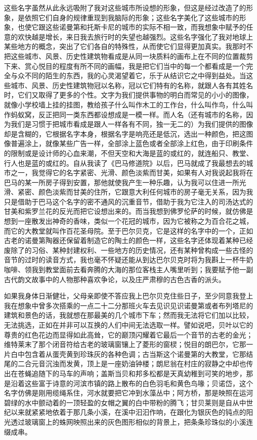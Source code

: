 \par 这些名字虽然从此永远吸附了我对这些城市所设想的形象，但这是经过改造了的形象，是依照它们自身的规律重现到我脑际的形象；这些名字美化了这些城市的形象，也使它跟这些诺曼第和托斯卡尼的城市的实际不相一致，而我想象中赋予的任意的欢快越是增长，来日我去旅行时的失望也越强烈。这些名字强化了我对地球上某些地方的概念，突出了它们各自的特殊性，从而使它们显得更加真实。我那时不把这些城市、风景、历史性建筑物看成是从同一块质料的画布上在不同的位置裁剪下来、赏心悦目的程度有所不同的画幅，我是把它们当中的每一个都看成是一个完全与众不同的陌生的东西，我的心灵渴望着它，乐于从结识它之中得到益处。当这些城市、风景、历史性建筑物冠以名称，冠以它们特有的名称，就跟人各有其姓名时，它们又取得了更多的个性。文字为我们提供事物的明白而常见的小小的图像，就像小学校墙上挂的挂图，教给孩子什么叫作木工的工作台，什么叫作鸟，什么叫作蚂蚁窝，反正把同一类东西都设想成是一模一样。而人名（还有城市的名称，因为我们是习惯于把城市看成是跟人一样各有不同，独一无二的）为我们提供的图像却是含糊的，它根据名字本身，根据名字是响亮还是低沉，选出一种颜色，把这图像普遍涂上，就像某些广告一样，全部涂上蓝色或者全部涂上红色，由于印刷条件的限制或是设计师的心血来潮，不但天空和大海是蓝的或红的，就连船只、教堂、行人也是蓝的或红的。自从我读了《巴马修道院》以后，巴马就成了我最想去的城市之一，我觉得它的名字紧密、光滑、颜色淡紫而甘美，如果有人对我说起我将在巴马的某一所房子得到安置，那他就使我产生一种乐趣，认为我可以住进一所光滑、紧密、颜色淡紫而甘美的住所，它跟意大利任何城市的房子毫无关系，因为我只是借助于巴马这个名字的密不通风的沉重音节，借助于我为它注入的司汤达式的甘美和紫罗兰花的反光而把它设想出来的。而当我想到佛罗伦萨的时候，就仿佛是想到一座散发出神奇的香味，类似一个花冠的城市，因为它被称之为百合花之城，而它的大教堂就叫作百花圣母院。至于巴尔贝克，它是这样的名字中的一个，正如古老的诺曼第陶器还保留着制造它的陶土的颜色一样，这些名字还体现着某种已经废除了的习俗、某种封建权利、一些地方的历史情况，还有某种曾构成一些古怪的音节的过时的读音方式，我也毫不怀疑还能从到达巴尔贝克时将为我斟上一杯牛奶咖啡、领我到教堂面前去看奔腾的大海的那位客栈主人嘴里听到；我要赋予他一副古代韵文故事中的人物那种喜欢争论，以及庄严肃穆的古色古香的派头。
\par 如果我身体日渐健壮，父母亲即使不答应我上巴尔贝克住些日子，至少同意我登上我在想象中曾多次搭乘的一点二十二分那班火车去见识见识诺曼第或者布列塔尼的建筑和景色的话，我就想在那最美的几个城市下车；然而我无法将它们加以比较，无法挑选，正如在并非可以互换的人们中间无法选取一样。譬如说吧，贝叶以它的尊贵的红色花边而显得如此高耸，它的巅顶闪耀着它最后一个音节的古老的金光；维特莱末了那个闭音符给古老的玻璃窗镶上了菱形的窗棂；悦目的朗巴尔，它那一片白中包含着从蛋壳黄到珍珠灰的各种色调；古当斯这个诺曼第的大教堂，它那结尾的二合元音沉浊而发黄，顶上是一座奶油钟楼；朗尼翁在村庄的寂静之中却也传出在苍蝇追随下的马车的声响；盖斯当贝和邦多松都是天真幼稚到可笑的地步，那是沿着这些富于诗意的河滨市镇的路上散布的白色羽毛和黄色鸟喙；贝诺岱，这个名字仿佛是刚用缆绳系住，河水就要把它冲到水藻丛中；阿方桥，那是映照在运河碧绿的水中颤动着的一顶轻盈的女帽之翼的白中带粉的腾飞；甘贝莱则是自从中世纪以来就紧紧地依着于那几条小溪，在溪中汩汩作响，在跟化为银灰色的钝点的阳光透过玻璃窗上的蛛网映照出来的灰色图形相似的背景上，把条条珍珠似的小溪连缀成串。
